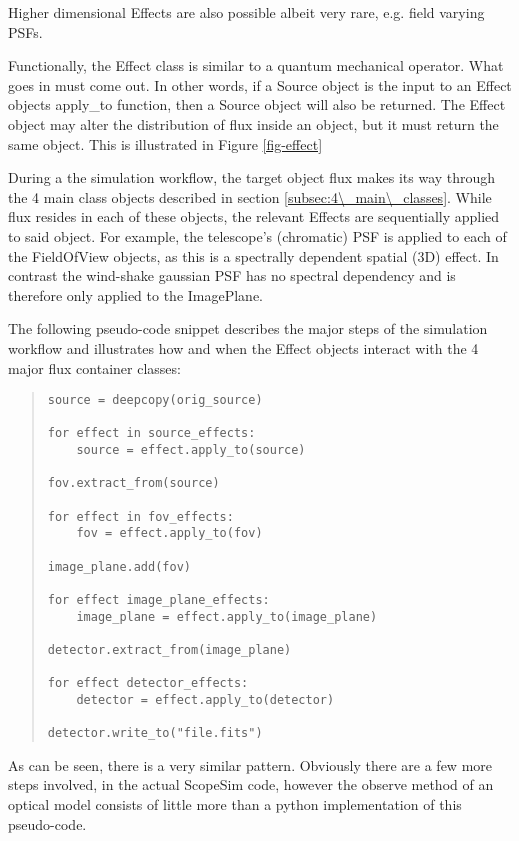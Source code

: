 Higher dimensional Effects are also possible albeit very rare, e.g. field varying PSFs.

Functionally, the Effect class is similar to a quantum mechanical operator.
What goes in must come out.
In other words, if a Source object is the input to an Effect objects \textquotedbl{}apply\_to\textquotedbl{} function, then a Source object will also be returned.
The Effect object may alter the distribution of flux inside an object, but it must return the same object.
This is illustrated in Figure \ref{fig-effect}

During a the simulation workflow, the target object flux makes its way through the 4 main class objects described in section \ref{subsec:4\_main\_classes}.
While flux resides in each of these objects, the relevant Effects are sequentially applied to said object.
For example, the telescope's (chromatic) PSF is applied to each of the FieldOfView objects, as this is a spectrally dependent spatial (3D) effect.
In contrast the wind-shake gaussian PSF has no spectral dependency and is therefore only applied to the ImagePlane.

The following pseudo-code snippet describes the major steps of the simulation workflow and illustrates how and when the Effect objects interact with the 4 major flux container classes:

\begin{quote}
\begin{alltt}
\begin{lstlisting}[frame=single]
source = deepcopy(orig_source)

for effect in source_effects:
    source = effect.apply_to(source)

fov.extract_from(source)

for effect in fov_effects:
    fov = effect.apply_to(fov)

image_plane.add(fov)

for effect image_plane_effects:
    image_plane = effect.apply_to(image_plane)

detector.extract_from(image_plane)

for effect detector_effects:
    detector = effect.apply_to(detector)

detector.write_to("file.fits")
\end{lstlisting}
\end{alltt}
\end{quote}

As can be seen, there is a very similar pattern.
Obviously there are a few more steps involved, in the actual ScopeSim code, however the \textquotedbl{}observe\textquotedbl{} method of an optical model consists of little more than a python implementation of this pseudo-code.

